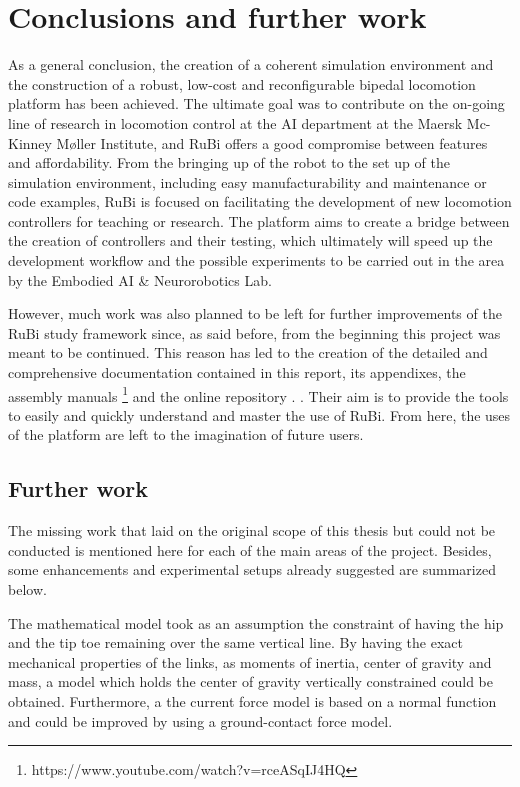 \chapter{Conclusions and further work} %
\label{cha:conclusions}
As a general conclusion, the creation of a coherent simulation environment and the construction of a robust, low-cost and reconfigurable bipedal locomotion platform has been achieved.
The ultimate goal was to contribute on the on-going line of research in locomotion control at the AI department at the Maersk Mc-Kinney Møller Institute, and RuBi offers a good compromise between features and affordability.
From the bringing up of the robot to the set up of the simulation environment,  including easy manufacturability and maintenance or code examples, RuBi is focused on facilitating the development of new locomotion controllers for teaching or research.
The platform aims to create a bridge between the creation of controllers and their testing, which ultimately will speed up the development workflow and the possible experiments to be carried out in the area by the Embodied AI \& Neurorobotics Lab.

However, much work was also planned to be left for further improvements of the RuBi study framework since, as said before, from the beginning this project was meant to be continued.
This reason has led to the creation of the detailed and comprehensive documentation contained in this report, its appendixes, the assembly manuals \footnote{https://www.youtube.com/watch?v=rceASqIJ4HQ} and the online repository \cite{rubi_repo}.
.
Their aim is to provide the tools to easily and quickly understand and master the use of RuBi.
From here, the uses of the platform are left to the imagination of future users.

\section{Further work} %
\label{sec:further_work}
The missing work that laid on the original scope of this thesis but could not be conducted is mentioned here for each of the main areas of the project.
Besides, some enhancements and experimental setups already suggested are summarized below.


The mathematical model took as an assumption the constraint of having the hip and the tip toe remaining over the same vertical line.
By having the exact mechanical properties of the links, as moments of inertia, center of gravity and mass, a model which holds the center of gravity vertically constrained could be obtained.
Furthermore, a the current force model  is based on a normal function and could be improved by using a ground-contact force model.

